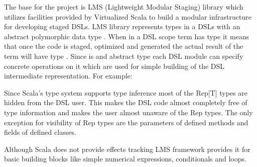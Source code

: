The base for the \tool project is LMS (Lightweight Modular Staging) library  which utilizes facilities provided by Virtualized Scala to build a modular infrastructure for developing staged DSLs. LMS library represents types in a DSLs with an abstract polymorphic data type . When in a DSL scope term has type  it means that once the code is staged, optimized and generated the actual result of the term will have type .  Since  is and abstract type each DSL module can specify concrete operations on it which are used for simple building of the DSL intermediate representation. For example: 

 
Since Scala's type system supports type inference  most of the Rep[T] types are hidden from the DSL user. This makes the DSL code almost completely free of type information and makes the user almost unaware of the Rep types. The only exception for visibility of Rep types are the parameters of defined methods and fields of defined classes.

Although Scala does not provide effects tracking LMS framework provides it for basic building blocks like simple numerical expressions, conditionals and loops.  


 
